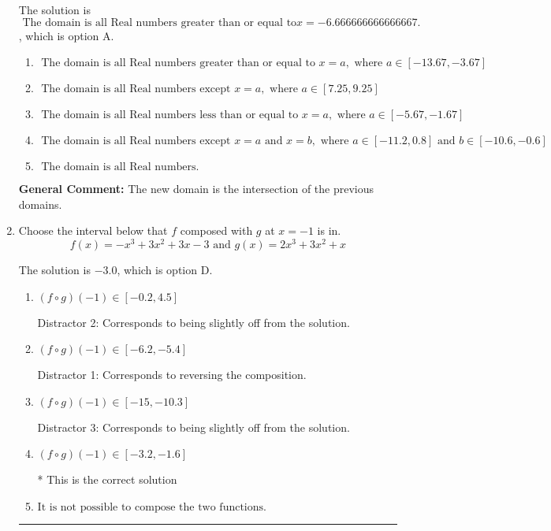 \documentclass{extbook}[14pt]
\newcommand{\litem}[1]{\item #1

\rule{\textwidth}{0.4pt}}
\begin{document}
\begin{enumerate}
{The solution is \( \text{ The domain is all Real numbers greater than or equal to} x = -6.666666666666667. \), which is option A.\begin{enumerate}[label=\Alph*.]
\item \( \text{ The domain is all Real numbers greater than or equal to } x = a, \text{ where } a \in [-13.67, -3.67] \)


\item \( \text{ The domain is all Real numbers except } x = a, \text{ where } a \in [7.25, 9.25] \)


\item \( \text{ The domain is all Real numbers less than or equal to } x = a, \text{ where } a \in [-5.67, -1.67] \)


\item \( \text{ The domain is all Real numbers except } x = a \text{ and } x = b, \text{ where } a \in [-11.2, 0.8] \text{ and } b \in [-10.6, -0.6] \)


\item \( \text{ The domain is all Real numbers. } \)


\end{enumerate}

\textbf{General Comment:} The new domain is the intersection of the previous domains.
}
\litem{
Choose the interval below that $f$ composed with $g$ at $x=-1$ is in.
\[ f(x) = -x^{3} +3 x^{2} +3 x -3 \text{ and } g(x) = 2x^{3} +3 x^{2} +x \]

The solution is \( -3.0 \), which is option D.\begin{enumerate}[label=\Alph*.]
\item \( (f \circ g)(-1) \in [-0.2, 4.5] \)

 Distractor 2: Corresponds to being slightly off from the solution.
\item \( (f \circ g)(-1) \in [-6.2, -5.4] \)

 Distractor 1: Corresponds to reversing the composition.
\item \( (f \circ g)(-1) \in [-15, -10.3] \)

 Distractor 3: Corresponds to being slightly off from the solution.
\item \( (f \circ g)(-1) \in [-3.2, -1.6] \)

* This is the correct solution
\item \( \text{It is not possible to compose the two functions.} \)


\end{enumerate}

}
\end{enumerate}
\end{document}
